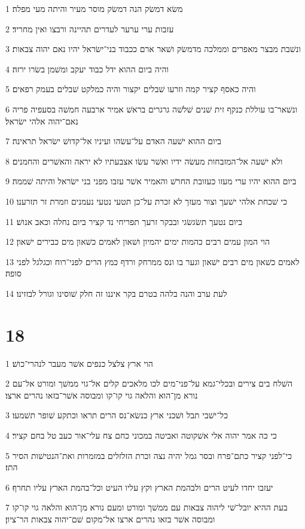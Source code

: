 \par 1 משׂא דמשׂק הנה דמשׂק מוסר מעיר והיתה מעי מפלה׃
\par 2 עזבות ערי ערער לעדרים תהיינה ורבצו ואין מחריד׃
\par 3 ונשׁבת מבצר מאפרים וממלכה מדמשׂק ושׁאר ארם ככבוד בני־ישׂראל יהיו נאם יהוה צבאות׃
\par 4 והיה ביום ההוא ידל כבוד יעקב ומשׁמן בשׂרו ירזה׃
\par 5 והיה כאסף קציר קמה וזרעו שׁבלים יקצור והיה כמלקט שׁבלים בעמק רפאים׃
\par 6 ונשׁאר־בו עוללת כנקף זית שׁנים שׁלשׁה גרגרים בראשׁ אמיר ארבעה חמשׁה בסעפיה פריה נאם־יהוה אלהי ישׂראל׃
\par 7 ביום ההוא ישׁעה האדם על־עשׂהו ועיניו אל־קדושׁ ישׂראל תראינה׃
\par 8 ולא ישׁעה אל־המזבחות מעשׂה ידיו ואשׁר עשׂו אצבעתיו לא יראה והאשׁרים והחמנים׃
\par 9 ביום ההוא יהיו ערי מעזו כעזובת החרשׁ והאמיר אשׁר עזבו מפני בני ישׂראל והיתה שׁממה׃
\par 10 כי שׁכחת אלהי ישׁעך וצור מעזך לא זכרת על־כן תטעי נטעי נעמנים וזמרת זר תזרענו׃
\par 11 ביום נטעך תשׂגשׂגי ובבקר זרעך תפריחי נד קציר ביום נחלה וכאב אנושׁ׃
\par 12 הוי המון עמים רבים כהמות ימים יהמיון ושׁאון לאמים כשׁאון מים כבירים ישׁאון׃
\par 13 לאמים כשׁאון מים רבים ישׁאון וגער בו ונס ממרחק ורדף כמץ הרים לפני־רוח וכגלגל לפני סופה׃
\par 14 לעת ערב והנה בלהה בטרם בקר איננו זה חלק שׁוסינו וגורל לבזזינו׃

\chapter{18}

\par 1 הוי ארץ צלצל כנפים אשׁר מעבר לנהרי־כושׁ׃
\par 2 השׁלח בים צירים ובכלי־גמא על־פני־מים לכו מלאכים קלים אל־גוי ממשׁך ומורט אל־עם נורא מן־הוא והלאה גוי קו־קו ומבוסה אשׁר־בזאו נהרים ארצו׃
\par 3 כל־ישׁבי תבל ושׁכני ארץ כנשׂא־נס הרים תראו וכתקע שׁופר תשׁמעו׃
\par 4 כי כה אמר יהוה אלי אשׁקוטה ואביטה במכוני כחם צח עלי־אור כעב טל בחם קציר׃
\par 5 כי־לפני קציר כתם־פרח ובסר גמל יהיה נצה וכרת הזלזלים במזמרות ואת־הנטישׁות הסיר התז׃
\par 6 יעזבו יחדו לעיט הרים ולבהמת הארץ וקץ עליו העיט וכל־בהמת הארץ עליו תחרף׃
\par 7 בעת ההיא יובל־שׁי ליהוה צבאות עם ממשׁך ומורט ומעם נורא מן־הוא והלאה גוי קו־קו ומבוסה אשׁר בזאו נהרים ארצו אל־מקום שׁם־יהוה צבאות הר־ציון׃

